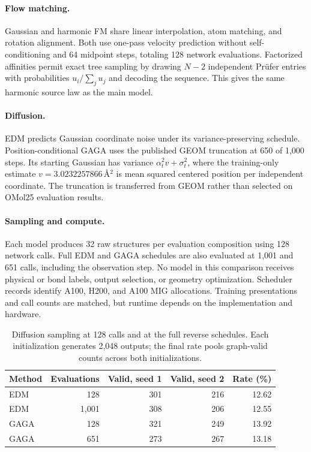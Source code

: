 \paragraph{Flow matching.}
Gaussian and harmonic FM share linear interpolation, atom matching, and rotation alignment. Both use one-pass velocity prediction without self-conditioning and 64 midpoint steps, totaling 128 network evaluations. Factorized affinities permit exact tree sampling by drawing $N-2$ independent Pr\"ufer entries with probabilities $u_i/\sum_j u_j$ and decoding the sequence. This gives the same harmonic source law as the main model.

\paragraph{Diffusion.}
EDM predicts Gaussian coordinate noise under its variance-preserving schedule. Position-conditional GAGA \citep{qu2026gaga} uses the published GEOM truncation at 650 of 1,000 steps. Its starting Gaussian has variance $\alpha_t^2 v+\sigma_t^2$, where the training-only estimate $v=3.0232257866$\,\AA$^2$ is mean squared centered position per independent coordinate. The truncation is transferred from GEOM rather than selected on OMol25 evaluation results.

\paragraph{Sampling and compute.}
Each model produces 32 raw structures per evaluation composition using 128 network calls. Full EDM and GAGA schedules are also evaluated at 1,001 and 651 calls, including the observation step. No model in this comparison receives physical or bond labels, output selection, or geometry optimization. Scheduler records identify A100, H200, and A100 MIG allocations. Training presentations and call counts are matched, but runtime depends on the implementation and hardware.

\begin{table}[htbp]
\centering
\caption{Diffusion sampling at 128 calls and at the full reverse schedules. Each initialization generates 2,048 outputs; the final rate pools graph-valid counts across both initializations.}
\begin{tabular}{lrrrr}
\toprule
Method & Evaluations & Valid, seed 1 & Valid, seed 2 & Rate (\%)\\
\midrule
EDM & 128 & 301 & 216 & 12.62\\
EDM & 1,001 & 308 & 206 & 12.55\\
GAGA & 128 & 321 & 249 & 13.92\\
GAGA & 651 & 273 & 267 & 13.18\\
\bottomrule
\end{tabular}
\end{table}
